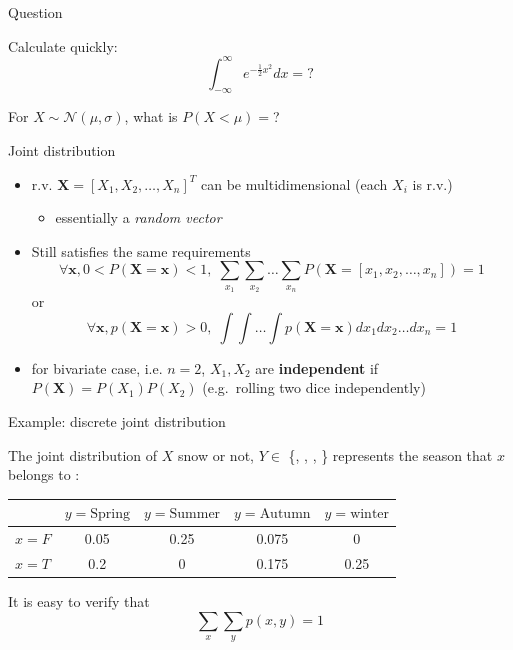 \documentclass{scrartcl}
\def\tightlist{}
\newcommand{\normal}[2]{\ensuremath{\mathcal{N}\left (#1,#2 \right )}}
\newcommand{\vv}[1]{\boldsymbol{#1}}
\begin{document}
\begin{frame}{Question}
\protect\hypertarget{question}{}

Calculate quickly: \[\int_{-\infty}^{\infty} e^{-\frac{1}{2}x^2}dx = ?\]

\bigskip

For \(X\sim \normal{\mu}{\sigma}\), what is \(P(X<\mu)=\)?

\end{frame}

\begin{frame}{Joint distribution}
\protect\hypertarget{joint-distribution}{}

\begin{itemize}
\tightlist
\item
  r.v. \(\vv{X} = [X_1, X_2, \ldots, X_n]^T\) can be multidimensional
  (each \(X_i\) is r.v.)

  \begin{itemize}
  \tightlist
  \item
    essentially a \emph{random vector}
  \end{itemize}

  \bigskip
\item
  Still satisfies the same requirements
  \[\forall \vv{x}, 0<P(\vv{X}=\vv{x}) <1,\; \sum_{x_1}\sum_{x_2}\ldots\sum_{x_n} P(\vv{X} =[x_1, x_2, \ldots, x_n]) =1\]
  or
  \[\forall \vv{x}, p(\vv{X}=\vv{x}) >0,\; \int\int\ldots\int p(\vv{X} =\vv{x})d{x_1}d{x_2\ldots dx_{n}} =1\]
  \bigskip 
\item
  for bivariate case, i.e. \(n=2\), \(X_1, X_2\) are
  \textbf{independent} if \(P(\vv{X}) = P(X_1)P(X_2)\) (e.g.~rolling two
  dice independently)
\end{itemize}

\end{frame}

\begin{frame}{Example: discrete joint distribution}
\protect\hypertarget{example-discrete-joint-distribution}{}

The joint distribution of \(X\) snow or not, \(Y\in\) \{,
, , \} represents the season that
\(x\) belongs to : \bigskip 

\begin{table}\centering
\begin{tabular}{ l | c | c | c | c}
   \centering                    
   & $y=\text{Spring}$ & $y=\text{Summer}$ &$y=\text{Autumn}$ & $y=\text{winter}$\\ 
   \hline
  $x= F$ & 0.05 & 0.25 & 0.075& 0\\
    \hline 
  $x= T$ & 0.2 & 0 & 0.175& 0.25\\ 
\end{tabular}
\end{table}
\bigskip

It is easy to verify that\\
\[\sum_x\sum_y p(x, y) = 1\]

\end{frame}
\end{document}
